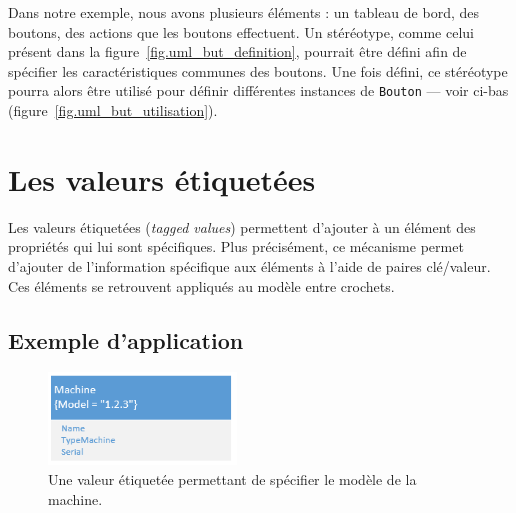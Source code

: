 


Dans notre exemple, nous avons plusieurs éléments : un tableau de bord, des boutons, des actions que les boutons effectuent.
Un stéréotype, comme celui présent dans la figure~\ref{fig.uml_but_definition}, pourrait être d\'efini afin de sp\'ecifier les caractéristiques communes des boutons.
%
Une fois d\'efini, ce st\'er\'eotype pourra alors \^etre utilis\'e pour
d\'efinir diff\'erentes instances de \texttt{Bouton} --- voir ci-bas (figure~\ref{fig.uml_but_utilisation}).



\section{Les valeurs \'etiquet\'ees}

Les valeurs \'etiquet\'ees (\emph{tagged values}) permettent d'ajouter \`a un \'el\'ement des propriétés qui lui sont spécifiques.
Plus pr\'ecis\'ement, ce m\'ecanisme permet d'ajouter de l'information spécifique aux éléments \`a l'aide de paires clé/valeur.
Ces éléments se retrouvent appliqués au modèle entre crochets.


\subsection{Exemple d'application}

\begin{figure}
    \begin{center}
    \includegraphics[width=5cm]{10_img/chap4/machine.PNG}
    \caption{Une valeur \'etiquet\'ee permettant de spécifier le modèle de la machine.}
    \label{fig.uml_mac}
    \end{center}
\end{figure}

